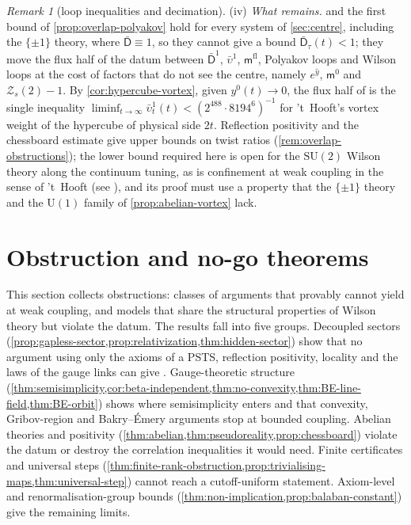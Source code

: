 \documentclass[11pt,a4paper]{amsart}
\theoremstyle{definition}
\theoremstyle{remark}
\newtheorem{remark}[theorem]{Remark}
\numberwithin{equation}{section}
\newcommand{\SU}{\mathrm{SU}}              %
\newcommand{\U}{\mathrm{U}}                %
\newcommand{\PSTS}{\textup{PSTS}}          %
\newcommand{\TT}{\mathbb{T}}               %
\newcommand{\Zc}{\mathcal{Z}}              %
\newcommand{\Zs}[2]{\Zc_{#1}(#2)}          %
\newcommand{\Mcirc}{\text{\upshape(M$^{\circ}$)}}   %
\newcommand{\Bcirc}{\text{\upshape(B$^{\circ}$)}}   %
\begin{document}
\begin{remark}[loop inequalities and decimation]
(iv) \emph{What remains.}  and the first bound of \cref{prop:overlap-polyakov} hold for every system of \cref{sec:centre}, including the $\{\pm1\}$ theory, where $\bar{\mathsf D}\equiv1$, so they cannot give a bound $\bar{\mathsf D}_\tau(t)<1$; they move the flux half of the datum between $\bar{\mathsf D}^1$, $\bar\upsilon^1$, $\mathsf m^{\mathrm{fl}}$, Polyakov loops and Wilson loops at the cost of factors that do not see the centre, namely $e^{\hat y}$, $\mathsf m^0$ and $\Zs{s}{2}-1$. By \cref{cor:hypercube-vortex}, given $y^0(t)\to0$, the flux half of \Mcirc{} is the single inequality $\liminf_{t\to\infty}\bar\upsilon^1_t(t)<(2^{488}\cdot8194^6)^{-1}$ for 't~Hooft's vortex weight of the hypercube of physical side $2t$. Reflection positivity and the chessboard estimate give upper bounds on twist ratios (\cref{rem:overlap-obstructions}); the lower bound required here is open for the $\SU(2)$ Wilson theory along the continuum tuning, as is confinement at weak coupling in the sense of 't~Hooft (see \cite{itoseiler2007,itoseiler2008}), and its proof must use a property that the $\{\pm1\}$ theory and the $\U(1)$ family of \cref{prop:abelian-vortex} lack.
\end{remark}
\section{Obstruction and no-go theorems}\label{sec:obstructions}

This section collects obstructions: classes of arguments that provably cannot yield \Mcirc{} at weak coupling, and models that share the structural properties of Wilson theory but violate the datum. The results fall into five groups. Decoupled sectors (\cref{prop:gapless-sector,prop:relativization,thm:hidden-sector}) show that no argument using only the axioms of a \PSTS{}, reflection positivity, locality and the laws of the gauge links can give \Bcirc{}. Gauge-theoretic structure (\cref{thm:semisimplicity,cor:beta-independent,thm:no-convexity,thm:BE-line-field,thm:BE-orbit}) shows where semisimplicity enters and that convexity, Gribov-region and Bakry--\'Emery arguments stop at bounded coupling. Abelian theories and positivity (\cref{thm:abelian,thm:pseudoreality,prop:chessboard}) violate the datum or destroy the correlation inequalities it would need. Finite certificates and universal steps (\cref{thm:finite-rank-obstruction,prop:trivialising-maps,thm:universal-step}) cannot reach a cutoff-uniform statement. Axiom-level and renormalisation-group bounds (\cref{thm:non-implication,prop:balaban-constant}) give the remaining limits.
\end{document}
